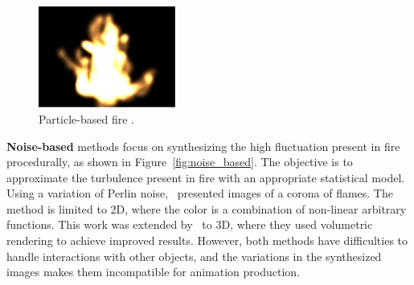 \begin{figure}[htpb!]
        \centering
		\includegraphics[width=0.4\textwidth]{img/perry_1994}
        \caption{Particle-based fire \cite{Perry:1994}.}
        \label{fig:particle_based}
\end{figure}

\textbf{Noise-based} methods focus on synthesizing the high fluctuation present in fire procedurally, as shown in Figure~\ref{fig:noise_based}.
The objective is to approximate the turbulence present in fire with an appropriate statistical model.
Using a variation of Perlin noise,~\cite{Perlin:1985} presented images of a corona of flames.
The method is limited to 2D, where the color is a combination of non-linear arbitrary functions.
This work was extended by~\cite{Perlin:1989} to 3D, where they used volumetric rendering to achieve improved results.
However, both methods have difficulties to handle interactions with other objects, and the variations in the synthesized images makes them incompatible for animation production. 

